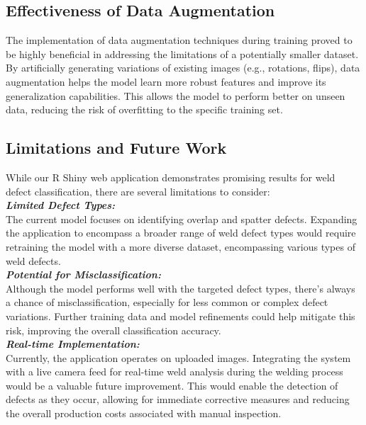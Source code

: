 \documentclass{article_saj}
\begin{document}
\subsection{Effectiveness of Data Augmentation}
\indent
\indent The implementation of data augmentation techniques during training proved to be highly beneficial in addressing the limitations of a potentially smaller dataset. By artificially generating variations of existing images (e.g., rotations, flips), data augmentation helps the model learn more robust features and improve its generalization capabilities. This allows the model to perform better on unseen data, reducing the risk of overfitting to the specific training set.

\subsection{Limitations and Future Work}
\indent 
\indent While our R Shiny web application demonstrates promising results for weld defect classification, there are several limitations to consider:\\

    \indent \textbf{\textit{Limited Defect Types:}}\\ \indent The current model focuses on identifying overlap and spatter defects. Expanding the application to encompass a broader range of weld defect types would require retraining the model with a more diverse dataset, encompassing various types of weld defects.\\
    
    \indent \textbf{\textit{Potential for Misclassification:}}\\ \indent Although the model performs well with the targeted defect types, there's always a chance of misclassification, especially for less common or complex defect variations. Further training data and model refinements could help mitigate this risk, improving the overall classification accuracy.\\
    
    \indent \textbf{\textit{Real-time Implementation:}}\\ \indent Currently, the application operates on uploaded images. Integrating the system with a live camera feed for real-time weld analysis during the welding process would be a valuable future improvement. This would enable the detection of defects as they occur, allowing for immediate corrective measures and reducing the overall production costs associated with manual inspection.\\
    
\end{document}

